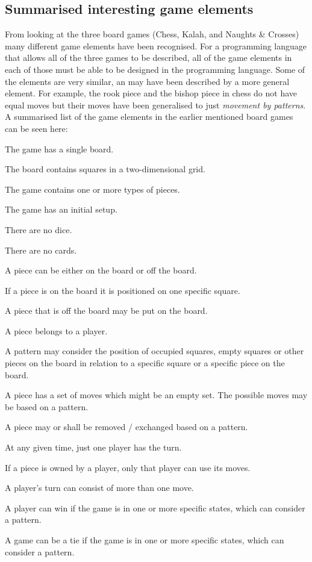\subsection{Summarised interesting game elements}
\label{subsec:differences}
From looking at the three board games (Chess, Kalah, and Naughts \& Crosses) many different game elements have been recognised. For a programming language that allows all of the three games to be described, all of the game elements in each of those must be able to be designed in the programming language. Some of the elements are very similar, an may have been described by a more general element. For example, the rook piece and the bishop piece in chess do not have equal moves but their moves have been generalised to just \textit{movement by patterns}. A summarised list of the game elements in the earlier mentioned board games can be seen here:
\begin{dlist}
  \item The game has a single board.
  \item The board contains squares in a two-dimensional grid.
  \item The game contains one or more types of pieces.
  \item The game has an initial setup.
  \item There are no dice.
  \item There are no cards.
  \item A piece can be either on the board or off the board. 
  \begin{dlist}
  \item If a piece is on the board it is positioned on one specific square.
  \item A piece that is off the board may be put on the board.
  \end{dlist}
  \item A piece belongs to a player.
  \item A pattern may consider the position of occupied squares, empty squares or other pieces on the board in relation to a specific square or a specific piece on the board.
  \item A piece has a set of moves which might be an empty set. The possible moves may be based on a pattern.
  \item A piece may or shall be removed / exchanged based on a pattern.
  \item At any given time, just one player has the turn.
  \item If a piece is owned by a player, only that player can use its moves.
  \item A player's turn can consist of more than one move.
  \item A player can win if the game is in one or more specific states, which can consider a pattern.
  \item A game can be a tie if the game is in one or more specific states, which can consider a pattern.
\end{dlist}

